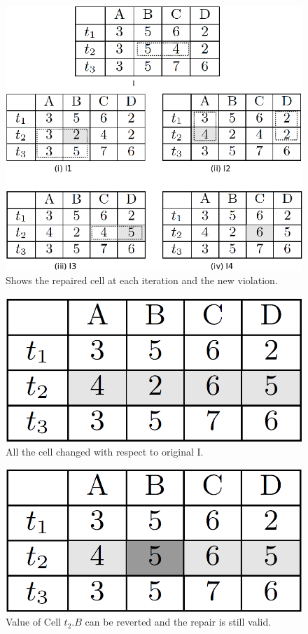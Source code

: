 \begin{figure}
   \centering
   \includegraphics[scale=0.28]{notSetMinEg.png}
   \caption{Shows the repaired cell at each iteration and the new violation.}
   \label{fig:notSetMinEg}
\end{figure}

\begin{figure}
   \centering
   \includegraphics[scale=0.2]{notSetMinEgFinal.png}
   \caption{All the cell changed with respect to original I.}
   \label{fig:notSetMinEgFinal}
\end{figure}

\begin{figure}
   \centering
   \includegraphics[scale=0.2]{notSetMinEgOther.png}
   \caption{Value of Cell $t_2.B$ can be reverted and the repair is still valid.}
   \label{fig:notSetMinEgOther}
\end{figure}

